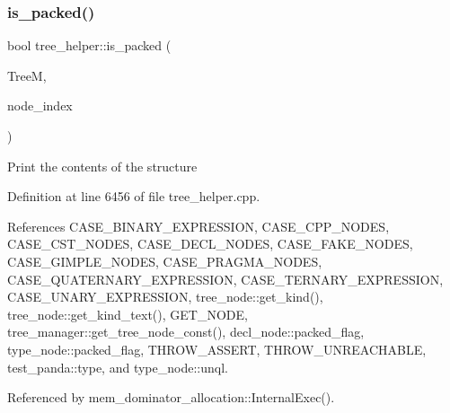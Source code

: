 \subsubsection{\texorpdfstring{is\+\_\+packed()}{is\_packed()}}
{\footnotesize\ttfamily bool tree\+\_\+helper\+::is\+\_\+packed (\begin{DoxyParamCaption}\item[{const \hyperlink{tree__manager_8hpp_a792e3f1f892d7d997a8d8a4a12e39346}{tree\+\_\+manager\+Const\+Ref} \&}]{TreeM,  }\item[{unsigned int}]{node\+\_\+index }\end{DoxyParamCaption})\hspace{0.3cm}{\ttfamily [static]}}

Print the contents of the structure 

Definition at line 6456 of file tree\+\_\+helper.\+cpp.



References C\+A\+S\+E\+\_\+\+B\+I\+N\+A\+R\+Y\+\_\+\+E\+X\+P\+R\+E\+S\+S\+I\+ON, C\+A\+S\+E\+\_\+\+C\+P\+P\+\_\+\+N\+O\+D\+ES, C\+A\+S\+E\+\_\+\+C\+S\+T\+\_\+\+N\+O\+D\+ES, C\+A\+S\+E\+\_\+\+D\+E\+C\+L\+\_\+\+N\+O\+D\+ES, C\+A\+S\+E\+\_\+\+F\+A\+K\+E\+\_\+\+N\+O\+D\+ES, C\+A\+S\+E\+\_\+\+G\+I\+M\+P\+L\+E\+\_\+\+N\+O\+D\+ES, C\+A\+S\+E\+\_\+\+P\+R\+A\+G\+M\+A\+\_\+\+N\+O\+D\+ES, C\+A\+S\+E\+\_\+\+Q\+U\+A\+T\+E\+R\+N\+A\+R\+Y\+\_\+\+E\+X\+P\+R\+E\+S\+S\+I\+ON, C\+A\+S\+E\+\_\+\+T\+E\+R\+N\+A\+R\+Y\+\_\+\+E\+X\+P\+R\+E\+S\+S\+I\+ON, C\+A\+S\+E\+\_\+\+U\+N\+A\+R\+Y\+\_\+\+E\+X\+P\+R\+E\+S\+S\+I\+ON, tree\+\_\+node\+::get\+\_\+kind(), tree\+\_\+node\+::get\+\_\+kind\+\_\+text(), G\+E\+T\+\_\+\+N\+O\+DE, tree\+\_\+manager\+::get\+\_\+tree\+\_\+node\+\_\+const(), decl\+\_\+node\+::packed\+\_\+flag, type\+\_\+node\+::packed\+\_\+flag, T\+H\+R\+O\+W\+\_\+\+A\+S\+S\+E\+RT, T\+H\+R\+O\+W\+\_\+\+U\+N\+R\+E\+A\+C\+H\+A\+B\+LE, test\+\_\+panda\+::type, and type\+\_\+node\+::unql.



Referenced by mem\+\_\+dominator\+\_\+allocation\+::\+Internal\+Exec().

